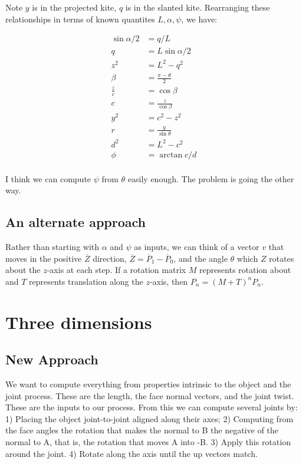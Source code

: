 \documentclass[11pt]{article}
\begin{document}
Note $y$ is in the projected kite, $q$ is in the slanted kite.
Rearranging these relationships in terms of known quantites $L, \alpha, \psi$, we have:

\begin{align*}
  \sin{\alpha/2} &= q/L \\
  q &= L \sin{\alpha/2} \\    
  z^2 &= L^2 - q^2 \\
  \beta &= \frac{\pi - \theta}{2} \\
  \frac{z}{c} &= \cos{\beta} \\
  c &= \frac{z}{\cos{\beta}} \\
  y^2 &= c^2 - z^2 \\
  r &= \frac{y}{\sin{\theta}} \\
  d^2 &= L^2 - c^2 \\
  \phi &= \arctan{c/d} \\
\end{align*}

I think we can compute $\psi$ from $\theta$ easily enough. The problem is going the other way.

\subsection{An alternate approach}

Rather than starting with $\alpha$ and $\psi$ as inputs, we can think of a vector $v$ that
moves in the positive $\overline Z$ direction, $\overline Z = \overline P_1 - \overline P_0$, and
the angle $\theta$ which $Z$ rotates about the $z$-axis at each step. If a rotation matrix $M$
represents rotation about and $T$ represents translation along the $z$-axis, then $P_n = (M+T)^nP_n$.


\section{Three dimensions}

\subsection{New Approach}

We want to compute everything from properties intrinsic to the object and the joint process.
These are the length, the face normal vectors, and the joint twist. These are the
inputs to our process.  From this we can compute several joints by:
1) Placing the object joint-to-joint aligned along their axes;
2) Computing from the face angles the rotation that makes the normal to B the
negative of the normal to A, that is, the rotation that moves A into -B.
3) Apply this rotation around the joint.
4) Rotate along the axis until the up vectors match.
\end{document}
